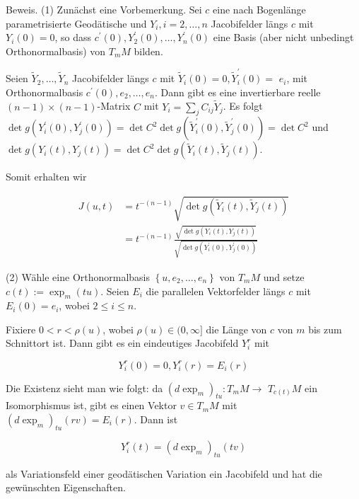 \documentclass[10pt]{article}
\begin{document}
Beweis. (1) Zunächst eine Vorbemerkung. Sei $c$ eine nach Bogenlänge parametrisierte Geodätische und $Y_{i}, i=2, \ldots, n$ Jacobifelder längs $c$ mit $Y_{i}(0)=0$, so dass $c^{\prime}(0), Y_{2}^{\prime}(0), \ldots, Y_{n}^{\prime}(0)$ eine Basis (aber nicht unbedingt Orthonormalbasis) von $T_{m} M$ bilden.

Seien $\tilde{Y}_{2}, \ldots, \tilde{Y}_{n}$ Jacobifelder längs $c$ mit $\tilde{Y}_{i}(0)=0, \tilde{Y}_{i}^{\prime}(0)=$ $e_{i}$, mit Orthonormalbasis $c^{\prime}(0), e_{2}, \ldots, e_{n}$. Dann gibt es eine invertierbare reelle $(n-1) \times(n-1)$-Matrix $C$ mit $Y_{i}=\sum_{j} C_{i j} \tilde{Y}_{j}$. Es folgt $\operatorname{det} g\left(Y_{i}^{\prime}(0), Y_{j}^{\prime}(0)\right)=\operatorname{det} C^{2} \operatorname{det} g\left(\tilde{Y}_{i}^{\prime}(0), \tilde{Y}_{j}^{\prime}(0)\right)=\operatorname{det} C^{2}$ und $\operatorname{det} g\left(Y_{i}(t), Y_{j}(t)\right)=\operatorname{det} C^{2} \operatorname{det} g\left(\tilde{Y}_{i}(t), \tilde{Y}_{j}(t)\right)$.

Somit erhalten wir

$$
\begin{aligned}
J(u, t) & =t^{-(n-1)} \sqrt{\operatorname{det} g\left(\tilde{Y}_{i}(t), \tilde{Y}_{j}(t)\right)} \\
& =t^{-(n-1)} \frac{\sqrt{\operatorname{det} g\left(Y_{i}(t), Y_{j}(t)\right)}}{\sqrt{\operatorname{det} g\left(Y_{i}^{\prime}(0), Y_{j}^{\prime}(0)\right)}}
\end{aligned}
$$

(2) Wähle eine Orthonormalbasis $\left\{u, e_{2}, \ldots, e_{n}\right\}$ von $T_{m} M$ und setze $c(t):=\exp _{m}(t u)$. Seien $E_{i}$ die parallelen Vektorfelder längs $c$ mit $E_{i}(0)=e_{i}$, wobei $2 \leq i \leq n$.

Fixiere $0<r<\rho(u)$, wobei $\rho(u) \in(0, \infty]$ die Länge von $c$ von $m$ bis zum Schnittort ist. Dann gibt es ein eindeutiges Jacobifeld $Y_{i}^{r}$ mit

$$
Y_{i}^{r}(0)=0, Y_{i}^{r}(r)=E_{i}(r)
$$

Die Existenz sieht man wie folgt: da $\left(d \exp _{m}\right)_{t u}: T_{m} M \rightarrow$ $T_{c(t)} M$ ein Isomorphismus ist, gibt es einen Vektor $v \in T_{m} M$ mit $\left(d \exp _{m}\right)_{t u}(r v)=E_{i}(r)$. Dann ist

$$
Y_{i}^{r}(t)=\left(d \exp _{m}\right)_{t u}(t v)
$$

als Variationsfeld einer geodätischen Variation ein Jacobifeld und hat die gewünschten Eigenschaften.
\end{document}
